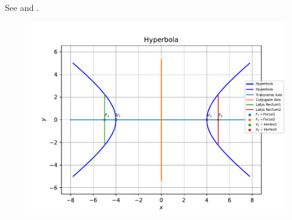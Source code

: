 See 
and
.
\begin{figure}[!h]
	\begin{center}
		\includegraphics[width=\columnwidth]{chapters/11/11/4/1/figs/problem1.pdf}
	\end{center}
\caption{}
\label{fig:11/11/4/1Fig1}
\end{figure}
